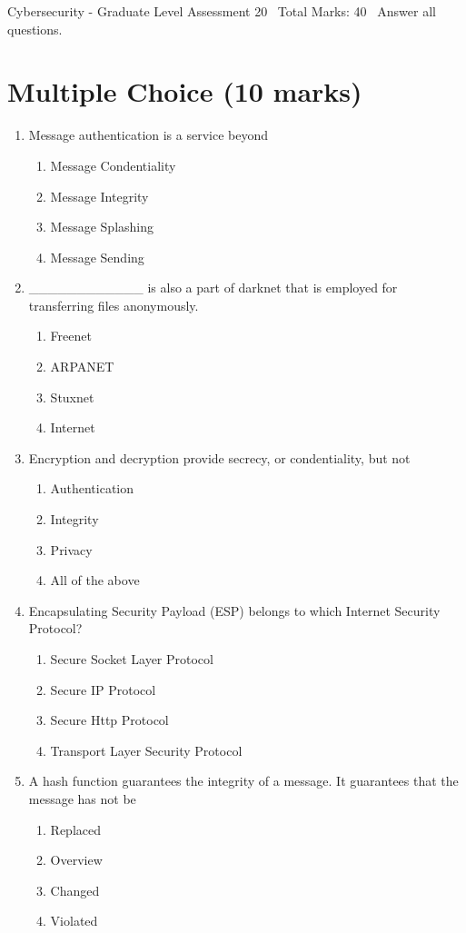 \documentclass[12pt]{article}
\begin{document}
\begin{center}
Cybersecurity - Graduate Level Assessment 20 \
Total Marks: 40 \
Answer all questions.
\end{center}

\section*{Multiple Choice (10 marks)}
\begin{enumerate}[label=\arabic*.]
\item Message authentication is a service beyond
\begin{enumerate}[label=(\alph*)]
    \item Message Condentiality
    \item Message Integrity
    \item Message Splashing
    \item Message Sending
\end{enumerate}
\item \_\_\_\_\_\_\_\_\_\_\_\_ is also a part of darknet that is employed for transferring files anonymously.
\begin{enumerate}[label=(\alph*)]
    \item Freenet
    \item ARPANET
    \item Stuxnet
    \item Internet
\end{enumerate}
\item Encryption and decryption provide secrecy, or condentiality, but not
\begin{enumerate}[label=(\alph*)]
    \item Authentication
    \item Integrity
    \item Privacy
    \item All of the above
\end{enumerate}
\item Encapsulating Security Payload (ESP) belongs to which Internet Security Protocol?
\begin{enumerate}[label=(\alph*)]
    \item Secure Socket Layer Protocol
    \item Secure IP Protocol
    \item Secure Http Protocol
    \item Transport Layer Security Protocol
\end{enumerate}
\item A hash function guarantees the integrity of a message. It guarantees that the message has not be
\begin{enumerate}[label=(\alph*)]
    \item Replaced
    \item Overview
    \item Changed
    \item Violated
\end{enumerate}
\end{enumerate}
\end{document}
